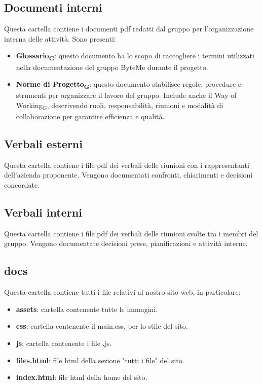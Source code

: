 \documentclass[11pt,a4paper]{article}
\newcommand{\gls}[1]{#1\textsubscript{G}}
\begin{document}
\subsection{Documenti interni}
Questa cartella contiene i documenti pdf redatti dal gruppo per l’organizzazione interna delle attività. Sono presenti:
\begin{itemize}
\item \textbf{\gls{Glossario}}: questo documento ha lo scopo di raccogliere i termini utilizzati nella documentazione del gruppo ByteMe durante il progetto.
\item \textbf{\gls{Norme di Progetto}}: questo documento stabilisce regole, procedure e strumenti per organizzare il lavoro del gruppo. Include anche il \gls{Way of Working}, descrivendo ruoli, responsabilità, riunioni e modalità di collaborazione per garantire efficienza e qualità.
\end{itemize}

\subsection{Verbali esterni}
Questa cartella contiene i file pdf dei verbali delle riunioni con i rappresentanti dell'azienda proponente. Vengono documentati confronti, chiarimenti e decisioni concordate.

\subsection{Verbali interni}
Questa cartella contiene i file pdf dei verbali delle riunioni svolte tra i membri del gruppo. Vengono documentate decisioni prese, pianificazioni e attività interne.

\subsection{docs}
Questa cartella contiene tutti i file relativi al nostro sito web, in particolare:
\begin{itemize}
\item \textbf{assets}: cartella contenente tutte le immagini.
\item \textbf{css}: cartella contenente il main.css, per lo stile del sito.
\item \textbf{js}: cartella contenente i file .js.
\item \textbf{files.html}: file html della sezione "tutti i file" del sito.
\item \textbf{index.html}: file html della home del sito.
\end{itemize}
\end{document}
